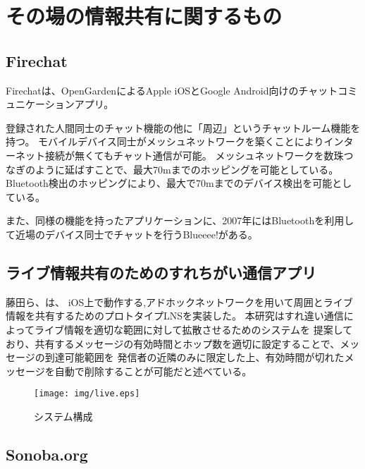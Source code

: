 
\section{その場の情報共有に関するもの}

\subsection{Firechat}

Firechat\cite{firechat}は、OpenGardenによるApple iOSとGoogle Android向けのチャットコミュニケーションアプリ。

登録された人間同士のチャット機能の他に「周辺」というチャットルーム機能を持つ。
モバイルデバイス同士がメッシュネットワークを築くことによりインターネット接続が無くてもチャット通信が可能。
メッシュネットワークを数珠つなぎのように延ばすことで、最大70mまでのホッピングを可能としている。
Bluetooth検出のホッピングにより、最大で70mまでのデバイス検出を可能としている。

また、同様の機能を持ったアプリケーションに、2007年にはBluetoothを利用して近場のデバイス同士でチャットを行うBlueeee!\cite{Blueeee}がある。


\subsection{ライブ情報共有のためのすれちがい通信アプリ}

藤田ら、\cite{藤田大樹:2012-09-04}\cite{藤田大樹:2013-08-20}\cite{藤田大樹:2013-03-06}は、
iOS上で動作する,アドホックネットワークを用いて周囲とライブ情報を共有するためのプロトタイプLNSを実装した。
本研究はすれ違い通信\cite{菊池大輝:2012-09-04}によってライブ情報を適切な範囲に対して拡散させるためのシステムを
提案しており、共有するメッセージの有効時間とホップ数を適切に設定することで、メッセージの到達可能範囲を
発信者の近隣のみに限定した上、有効時間が切れたメッセージを自動で削除することが可能だと述べている。

\begin{figure}[h]
  \begin{center}
    \texttt{[image: img/live.eps]}
  \end{center}
  \caption{システム構成}
  \label{fig:live}
\end{figure}

\subsection{Sonoba.org}

